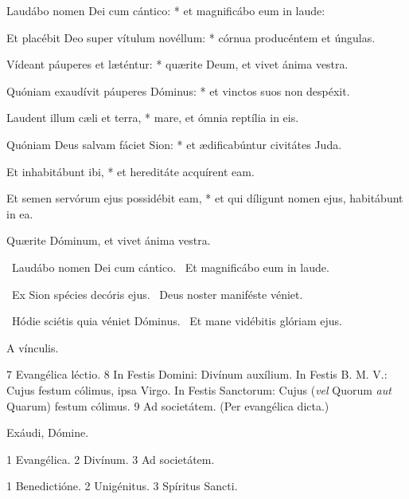 Laudábo nomen Dei cum cántico: * et magnificábo eum in laude:

Et placébit Deo super vítulum novéllum: * córnua producéntem et úngulas.

Vídeant páuperes et læténtur: * quærite Deum, et vivet ánima vestra.

Quóniam exaudívit páuperes Dóminus: * et vinctos suos non despéxit.

Laudent illum cæli et terra, * mare, et ómnia reptília in eis.

Quóniam Deus salvam fáciet Sion: * et ædificabúntur civitátes Juda.

Et inhabitábunt ibi, * et hereditáte acquírent eam.

Et semen servórum ejus possidébit eam, * et qui díligunt nomen ejus, habitábunt in ea.

 Quærite Dóminum, et vivet ánima vestra.


\V\ Laudábo nomen Dei cum cántico. \R\ Et magnificábo eum in laude.


\V\ Ex Sion spécies decóris ejus. \R\ Deus noster maniféste véniet.


\V\ Hódie sciétis quia véniet Dóminus. \R\ Et mane vidébitis glóriam ejus.


 A vínculis.

 7 Evangélica léctio. 8 In Festis Domini: Divínum auxílium. In Festis B. M. V.: Cujus festum cólimus, ipsa Virgo. In Festis Sanctorum: Cujus (\textit{vel} Quorum \textit{aut} Quarum) festum cólimus. 9 Ad societátem. (Per evangélica dicta.)


 Exáudi, Dómine.


 1 Evangélica. 2 Divínum. 3 Ad societátem.


 1 Benedictióne. 2 Unigénitus. 3 Spíritus Sancti.


